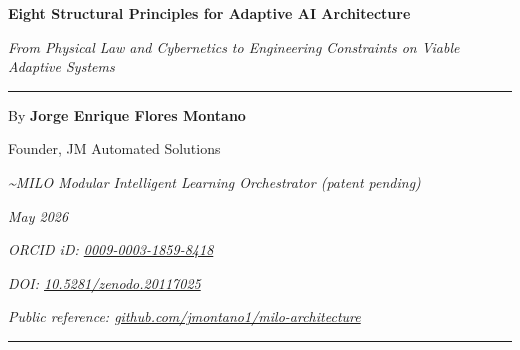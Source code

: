 \documentclass[11pt,letterpaper,oneside]{article}
\newcommand{\milotitle}{Eight Structural Principles for Adaptive AI Architecture}
\newcommand{\milosubtitle}{From Physical Law and Cybernetics to Engineering Constraints on Viable Adaptive Systems}
\newcommand{\milodate}{May 2026}
\begin{document}
\thispagestyle{titlepage}
\begin{center}
\vspace*{0.2in}
{\sffamily\Large\bfseries\color{milonavy} \milotitle\par}
\vspace{0.15in}
{\itshape\normalsize \milosubtitle\par}
\vspace{0.18in}
{\color{milonavy}\rule{0.35\textwidth}{0.8pt}\par}
\vspace{0.18in}
{\large By \textbf{Jorge Enrique Flores Montano}\par}
{\normalsize Founder, JM Automated Solutions\par}
{\small\itshape\textcolor{black!70}{\textasciitilde MILO\texttrademark{} \textemdash{} Modular Intelligent Learning Orchestrator (patent pending)}\par}
{\small\itshape\textcolor{black!70}{\milodate}\par}
{\small\itshape\textcolor{black!70}{ORCID iD: \href{https://orcid.org/0009-0003-1859-8418}{0009-0003-1859-8418}}\par}
{\small\itshape\textcolor{black!70}{DOI: \href{https://doi.org/10.5281/zenodo.20117025}{10.5281/zenodo.20117025}}\par}
{\small\itshape\textcolor{black!70}{Public reference: \href{https://github.com/jmontano1/milo-architecture}{github.com/jmontano1/milo-architecture}}\par}
\vspace{0.15in}
{\color{milonavy}\rule{\textwidth}{0.6pt}\par}
\end{center}


\end{document}
